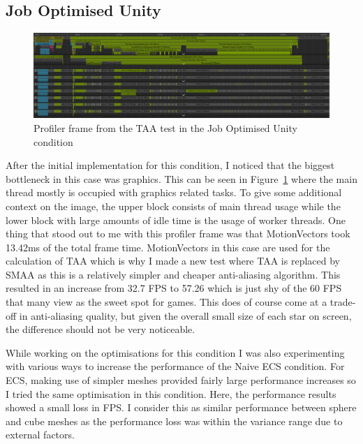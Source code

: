 \subsection{Job Optimised Unity}
\begin{figure}[tbph]
    \centering
    \includegraphics[width=1\textwidth]{Figures/JobUnityStandardFrame.png}
    \caption[Profiler frame from a Job Optimised Unity test]{Profiler frame from the TAA test in the Job Optimised Unity condition}
    \label{fig:joboptimisedtaaframe}
\end{figure}

After the initial implementation for this condition, I noticed that the biggest bottleneck in this case was graphics. This can be seen in Figure~\ref{fig:joboptimisedtaaframe} where the main thread mostly is occupied with graphics related tasks. To give some additional context on the image, the upper block consists of main thread usage while the lower block with large amounts of idle time is the usage of worker threads. One thing that stood out to me with this profiler frame was that MotionVectors took 13.42ms of the total frame time. MotionVectors in this case are used for the calculation of TAA which is why I made a new test where TAA is replaced by SMAA as this is a relatively simpler and cheaper anti-aliasing algorithm. This resulted in an increase from 32.7 FPS to 57.26 which is just shy of the 60 FPS that many view as the sweet spot for games. This does of course come at a trade-off in anti-aliasing quality, but given the overall small size of each star on screen, the difference should not be very noticeable. 

While working on the optimisations for this condition I was also experimenting with various ways to increase the performance of the Naive ECS condition. For ECS, making use of simpler meshes provided fairly large performance increases so I tried the same optimisation in this condition. Here, the performance results showed a small loss in FPS. I consider this as similar performance between sphere and cube meshes as the performance loss was within the variance range due to external factors.  

